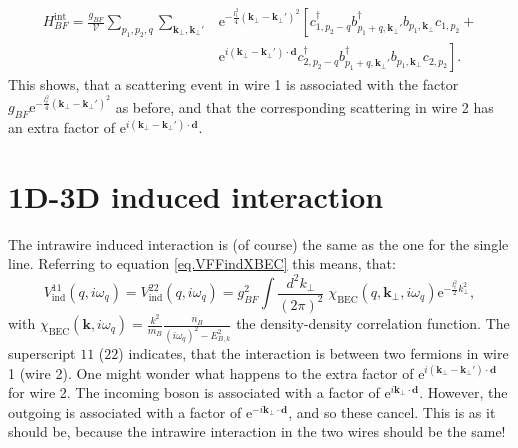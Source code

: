 \begin{align}
H_{BF}^\text{int} = \frac{g_{BF}}{\mathcal{V}}\sum_{p_1,p_2,q} \sum_{\mathbf{k}_\perp, \mathbf{k}_\perp'} & \text{e}^{-\frac{l_t^2}{4}(\mathbf{k}_\perp - \mathbf{k}_\perp')^2}\left[ c^\dagger_{1,p_2-q} b^\dagger_{p_1+q, \mathbf{k}_\perp'} b_{p_1,\mathbf{k}_\perp}c_{1,p_2} + \right. \nonumber \\
& \left. \text{e}^{i(\mathbf{k}_\perp - \mathbf{k}_\perp')\cdot \mathbf{d}}c_{2,p_2-q}^\dagger b_{p_1+q, \mathbf{k}_\perp'}^\dagger b_{p_1,\mathbf{k}_\perp}c_{2,p_2} \right].
\end{align}
This shows, that a scattering event in wire 1 is associated with the factor $g_{BF} \text{e}^{-\frac{l_t^2}{4}(\mathbf{k}_\perp - \mathbf{k}_\perp')^2}$ as before, and that the corresponding scattering in wire 2 has an extra factor of $\text{e}^{i(\mathbf{k}_\perp - \mathbf{k}_\perp')\cdot \mathbf{d}}$. 

\section{1D-3D induced interaction}
The intrawire induced interaction is (of course) the same as the one for the single line. Referring to equation \ref{eq.VFFindXBEC} this means, that:
\begin{equation}
V_{\text{ind}}^{11}(q,i\omega_q) = V_{\text{ind}}^{22}(q,i\omega_q) = g_{BF}^2\int\frac{d^2k_\perp}{(2\pi)^2}\; \chi_\text{BEC}(q,\mathbf{k}_\perp,i\omega_q)\text{e}^{-\frac{l_t^2}{2}k_\perp^2}, 
\label{eq.VFF1122indXBEC} 
\end{equation}
with $\chi_\text{BEC}(\mathbf{k},i\omega_q) = \frac{k^2}{m_B}\frac{n_B}{(i\omega_q)^2-E_{B,k}^2}$ the density-density correlation function. The superscript $11$ ($22$) indicates, that the interaction is between two fermions in wire 1 (wire 2). One might wonder what happens to the extra factor of $\text{e}^{i(\mathbf{k}_\perp - \mathbf{k}_\perp')\cdot \mathbf{d}}$ for wire 2. The incoming boson is associated with a factor of $\text{e}^{i\mathbf{k}_\perp\cdot \mathbf{d}}$. However, the outgoing is associated with a factor of $\text{e}^{-i\mathbf{k}_\perp\cdot \mathbf{d}}$, and so these cancel. This is as it should be, because the intrawire interaction in the two wires should be the same!

